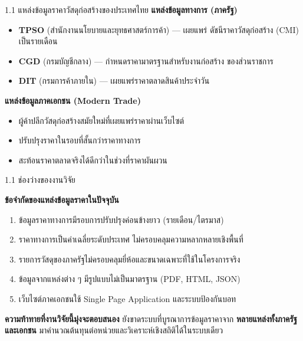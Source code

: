 \documentclass[aspectratio=169,11pt]{beamer}
\begin{document}
\begin{frame}{1.1 แหล่งข้อมูลราคาวัสดุก่อสร้างของประเทศไทย}
  \textbf{แหล่งข้อมูลทางการ (ภาครัฐ)}
  \begin{itemize}
    \item \textbf{TPSO} (สำนักงานนโยบายและยุทธศาสตร์การค้า) --- เผยแพร่
          ดัชนีราคาวัสดุก่อสร้าง (CMI) เป็นรายเดือน
    \item \textbf{CGD} (กรมบัญชีกลาง) --- กำหนดราคามาตรฐานสำหรับงานก่อสร้าง
          ของส่วนราชการ
    \item \textbf{DIT} (กรมการค้าภายใน) --- เผยแพร่ราคาตลาดสินค้าประจำวัน
  \end{itemize}
  \vspace{0.3em}
  \textbf{แหล่งข้อมูลภาคเอกชน (Modern Trade)}
  \begin{itemize}
    \item ผู้ค้าปลีกวัสดุก่อสร้างสมัยใหม่ที่เผยแพร่ราคาผ่านเว็บไซต์
    \item ปรับปรุงราคาในรอบที่สั้นกว่าราคาทางการ
    \item สะท้อนราคาตลาดจริงได้ดีกว่าในช่วงที่ราคาผันผวน
  \end{itemize}
\end{frame}

\begin{frame}{1.1 ช่องว่างของงานวิจัย}
  \begin{block}{\textbf{ข้อจำกัดของแหล่งข้อมูลราคาในปัจจุบัน}}
  \begin{enumerate}
    \item ข้อมูลราคาทางการมีรอบการปรับปรุงค่อนข้างยาว (รายเดือน/ไตรมาส)
    \item ราคาทางการเป็นค่าเฉลี่ยระดับประเทศ ไม่ครอบคลุมความหลากหลายเชิงพื้นที่
    \item รายการวัสดุของภาครัฐไม่ครอบคลุมยี่ห้อและขนาดเฉพาะที่ใช้ในโครงการจริง
    \item ข้อมูลจากแหล่งต่าง ๆ มีรูปแบบไม่เป็นมาตรฐาน (PDF, HTML, JSON)
    \item เว็บไซต์ภาคเอกชนใช้ Single Page Application และระบบป้องกันบอท
  \end{enumerate}
  \end{block}
  \vspace{0.3em}
  \begin{alertblock}{\textbf{ความท้าทายที่งานวิจัยนี้มุ่งจะตอบสนอง}}
  ยังขาดระบบที่บูรณาการข้อมูลราคาจาก \textbf{หลายแหล่งทั้งภาครัฐและเอกชน}
  มาคำนวณต้นทุนต่อหน่วยและวิเคราะห์เชิงสถิติได้ในระบบเดียว
  \end{alertblock}
\end{frame}
\end{document}

